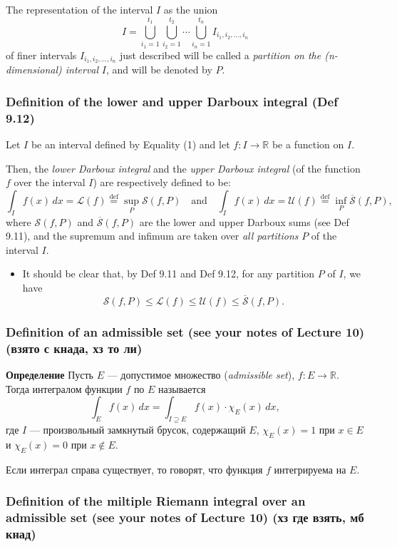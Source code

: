 The representation of the interval $I$ as the union
\[
    I = \bigcup_{i_1 = 1}^{t_1} \bigcup_{i_2 = 1}^{t_2} \cdots \bigcup_{i_n = 1}^{t_n} I_{i_1, i_2, \dots, i_n}
\]
of finer intervals $I_{i_1, i_2, \dots, i_n}$ just described will be called a \textit{partition on the (n-dimensional) interval} $I$, and will be denoted by $P$.

\subsubsection{Definition of the lower and upper Darboux integral (Def 9.12)}

Let $I$ be an interval defined by Equality (1) and let $f: I \to \mathbb{R}$ be a function on $I$.

Then, the \textit{lower Darboux integral} and the \textit{upper Darboux integral} (of the function $f$ over the interval $I$) are respectively defined to be:
\[
    \int_I f(x) \, dx = \mathcal{L}(f) \overset{\text{def}}{=} \sup_P \mathcal{S}(f, P)
    \quad \text{and} \quad
    \int_I f(x) \, dx = \mathcal{U}(f) \overset{\text{def}}{=} \inf_P \overline{\mathcal{S}}(f, P),
\]
where $\mathcal{S}(f, P)$ and $\overline{\mathcal{S}}(f, P)$ are the lower and upper Darboux sums (see Def 9.11), and the supremum and infimum are taken over \textit{all partitions} $P$ of the interval $I$.

\begin{itemize}
    \item It should be clear that, by Def 9.11 and Def 9.12, for any partition $P$ of $I$, we have
    \[
        \mathcal{S}(f, P) \leq \mathcal{L}(f) \leq \mathcal{U}(f) \leq \overline{\mathcal{S}}(f, P).
    \]
\end{itemize}

\subsubsection{Definition of an admissible set (see your notes of Lecture 10) (взято с кнада, хз то ли)}

\textbf{Определение} Пусть $E$ — допустимое множество (\textit{admissible set}), $f: E \to \mathbb{R}$. Тогда интегралом функции $f$ по $E$ называется
\[
    \int_E f(x) \, dx = \int_{I \supseteq E} f(x) \cdot \chi_E(x) \, dx,
\]
где $I$ — произвольный замкнутый брусок, содержащий $E$,
$\chi_E(x) = 1$ при $x \in E$ и $\chi_E(x) = 0$ при $x \notin E$.

Если интеграл справа существует, то говорят, что функция $f$ интегрируема на $E$.

\subsubsection{Definition of the miltiple Riemann integral over an admissible set (see your notes of Lecture 10) (хз где взять, мб кнад)}

\clearpage
